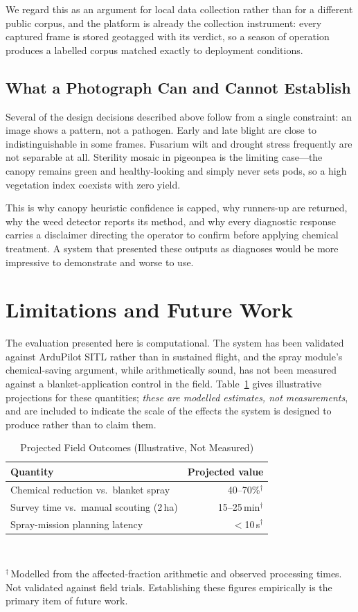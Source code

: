 \documentclass[conference]{IEEEtran}
\begin{document}
We regard this as an argument for local data collection rather than for a
different public corpus, and the platform is already the collection instrument:
every captured frame is stored geotagged with its verdict, so a season of
operation produces a labelled corpus matched exactly to deployment conditions.

\subsection{What a Photograph Can and Cannot Establish}

Several of the design decisions described above follow from a single
constraint: an image shows a pattern, not a pathogen. Early and late blight are
close to indistinguishable in some frames. Fusarium wilt and drought stress
frequently are not separable at all. Sterility mosaic in pigeonpea is the
limiting case---the canopy remains green and healthy-looking and simply never
sets pods, so a high vegetation index coexists with zero yield.

This is why canopy heuristic confidence is capped, why runners-up are returned,
why the weed detector reports its method, and why every diagnostic response
carries a disclaimer directing the operator to confirm before applying chemical
treatment. A system that presented these outputs as diagnoses would be more
impressive to demonstrate and worse to use.

\section{Limitations and Future Work}

The evaluation presented here is computational. The system has been validated
against ArduPilot SITL rather than in sustained flight, and the spray module's
chemical-saving argument, while arithmetically sound, has not been measured
against a blanket-application control in the field. Table~\ref{tab:projected}
gives illustrative projections for these quantities; \emph{these are modelled
estimates, not measurements}, and are included to indicate the scale of the
effects the system is designed to produce rather than to claim them.

\begin{table}[!t]
\caption{Projected Field Outcomes (Illustrative, Not Measured)}
\label{tab:projected}
\centering
\footnotesize
\begin{tabular}{@{}lr@{}}
\toprule
Quantity & Projected value \\
\midrule
Chemical reduction vs.\ blanket spray & 40--70\%$^\dagger$ \\
Survey time vs.\ manual scouting (2\,ha) & 15--25\,min$^\dagger$ \\
Spray-mission planning latency & $<$10\,s$^\dagger$ \\
\bottomrule
\end{tabular}
\\[3pt]
\raggedright\scriptsize
$^\dagger$\,Modelled from the affected-fraction arithmetic and observed
processing times. Not validated against field trials. Establishing these
figures empirically is the primary item of future work.
\end{table}
\end{document}
